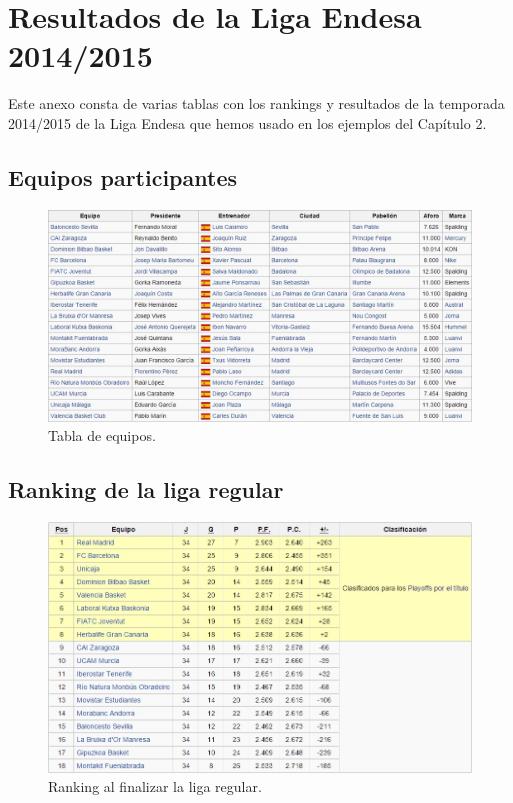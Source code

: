 \chapter{Resultados de la Liga Endesa 2014/2015}
Este anexo consta de varias tablas con los rankings y resultados de la temporada 2014/2015 de la Liga Endesa \cite{acbresults} que hemos usado en los ejemplos del Capítulo 2.\\

\section*{Equipos participantes}

\begin{figure}[H]
	\centering
	\includegraphics[scale=0.6]{images/equipos.jpg}
	\caption{Tabla de equipos.} 
\end{figure}

\section*{Ranking de la liga regular}

\begin{figure}[H]
	\centering
	\includegraphics[scale=0.7]{images/regular.jpg}
	\caption{Ranking al finalizar la liga regular.} 
\end{figure}


